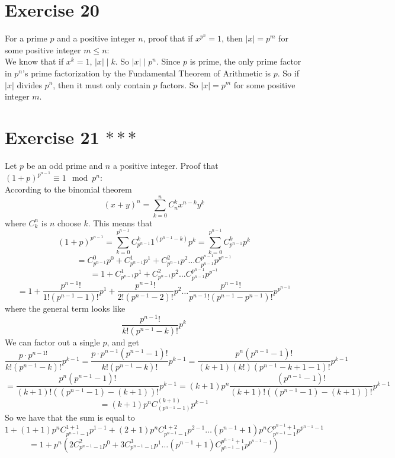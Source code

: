 \documentclass[12pt]{article}
\begin{document}
    \section*{Exercise 20}
    For a prime $p$ and a positive integer $n$, proof that if $x^{p^n} = 1$,
    then $|x| = p^m$ for some positive integer $m \leqslant n$: \\
    We know that if $x^k = 1$, $|x| \mid k$.
    So $|x| \mid p^n$.
    Since $p$ is prime, the only prime factor in $p^n$'s
    prime factorization by the Fundamental Theorem of Arithmetic
    is $p$.
    So if $|x|$ divides $p^n$, then it must only contain $p$ factors.
    So $|x| = p^m$ for some positive integer $m$.


    \section*{Exercise 21 $***$}
    Let $p$ be an odd prime and $n$ a positive integer.
    Proof that $(1 + p)^{p^{n-1}} \equiv 1 \mod p^n$: \\ 
    According to the binomial theorem
    \[ (x + y)^n = \sum_{k = 0}^{n} C_{n}^{k}x^{n-k}y^k \]
    where $C_{k}^{n}$ is $n$ choose $k$. This means that 
    \[ (1 + p)^{p^{n-1}}
    = \sum_{k = 0}^{p^{n-1}} C_{p^{n-1}}^{k}1^{(p^{n-1} - k)}p^k
    = \sum_{k = 0}^{p^{n-1}} C_{p^{n-1}}^{k}p^k \]
    \[ = C_{p^{n-1}}^0p^0 + C_{p^{n-1}}^1p^1 + C_{p^{n-1}}^2p^{2}
    \dots C_{p^{n-1}}^{p^{n-1}}p^{p^{n-1}} \]
    \[ = 1 + C_{p^{n-1}}^1p^1 + C_{p^{n-1}}^2p^2
    \dots C_{p^{n-1}}^{p^{n-1}}p^{p^{-1}} \]
    \[ = 1 + \dfrac{p^{n-1}!}{1!(p^{n-1} - 1)!}p^1
    + \dfrac{p^{n-1}!}{2!(p^{n-1} - 2)!}p^2 \dots
    \dfrac{p^{n-1}!}{p^{n-1}!(p^{n-1} - p^{n-1})!}p^{p^{n-1}} \]
    where the general term looks like
    \[ \dfrac{p^{n-1}!}{k!(p^{n-1} - k)!}p^k \]
    We can factor out a single $p$, and get
    \[ \dfrac{p \cdot p^{n-1!}}{k!(p^{n-1} - k)!}p^{k-1}
    = \dfrac{p \cdot p^{n-1}(p^{n-1} - 1)!}{k!(p^{n-1} - k)!}p^{k-1}
    = \dfrac{p^n(p^{n-1} - 1)!}{(k+1)(k!)(p^{n-1} - k + 1 - 1)!}p^{k-1} \]
    \[ = \dfrac{p^n(p^{n-1} - 1)!}{(k + 1)!((p^{n-1} - 1)-(k + 1))!}p^{k-1}
    = (k+1)p^n \dfrac{(p^{n-1}-1)!}{(k + 1)!((p^{n-1}-1)-(k + 1))!}p^{k-1} \]
    \[ = (k+1)p^n C_{(p^{n-1} - 1)}^{(k+1)} p^{k-1} \]
    So we have that the sum is equal to
    \[ 1 + (1 + 1)p^nC_{p^{n-1} - 1}^{1 + 1}p^{1-1}
    + (2+1)p^nC_{p^{n-1} - 1}^{1 + 2}p^{2-1} \dots
    (p^{n-1}+1)p^nC_{p^{n-1} - 1}^{p^{n-1} + 1}p^{p^{n-1}-1} \]
    \[ = 1 + p^n(2C_{p^{n-1} - 1}^{2}p^{0}
    + 3C_{p^{n-1} - 1}^{3}p^{1} \dots
    (p^{n-1}+1)C_{p^{n-1} - 1}^{p^{n-1} + 1}p^{p^{n-1}-1}) \]
\end{document}
